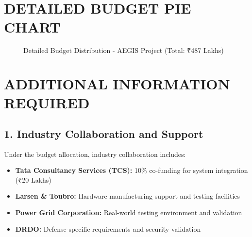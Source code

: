 \documentclass[12pt,a4paper]{article}
\begin{document}
\section{DETAILED BUDGET PIE CHART}

\begin{figure}[H]
\centering
{}
\caption{Detailed Budget Distribution - AEGIS Project (Total: ₹487 Lakhs)}
\label{fig:detailed_budget}
\end{figure}

\newpage

\section*{ADDITIONAL INFORMATION REQUIRED}

\subsection*{1. Industry Collaboration and Support}
Under the budget allocation, industry collaboration includes:
\begin{itemize}
    \item \textbf{Tata Consultancy Services (TCS):} 10\% co-funding for system integration (₹20 Lakhs)
    \item \textbf{Larsen \& Toubro:} Hardware manufacturing support and testing facilities
    \item \textbf{Power Grid Corporation:} Real-world testing environment and validation
    \item \textbf{DRDO:} Defense-specific requirements and security validation
\end{itemize}
\end{document}

